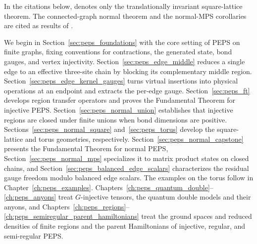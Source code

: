 In the citations below, \cite[Theorem~3]{Molnar2018NormalPEPS} denotes only
the translationally invariant square-lattice theorem. The connected-graph
normal theorem and the normal-MPS corollaries are cited as results of
\cite[Section~4]{Molnar2018NormalPEPS}.

We begin in Section~\ref{sec:peps_foundations} with the core setting of PEPS
on finite graphs, fixing conventions for contractions, the generated state,
bond gauges, and vertex injectivity.
Section~\ref{sec:peps_edge_middle} reduces a single edge to an effective
three-site chain by blocking its complementary middle region.
Section~\ref{sec:peps_edge_kernel_gauges} turns virtual insertions into physical
operations at an endpoint and extracts the per-edge gauge.
Section~\ref{sec:peps_ft} develops region transfer operators and proves
the Fundamental Theorem for injective PEPS.
Section~\ref{sec:peps_normal_union} establishes that injective regions are closed
under finite unions when bond dimensions are positive.
Sections~\ref{sec:peps_normal_square} and~\ref{sec:peps_torus} develop the
square-lattice and torus geometries, respectively.
Section~\ref{sec:peps_normal_capstone} presents the Fundamental Theorem for
normal PEPS, Section~\ref{sec:peps_normal_mps} specializes it to matrix product
states on closed chains, and Section~\ref{sec:peps_balanced_edge_scalars}
characterizes the residual gauge freedom modulo balanced edge scalars.
The examples on the torus follow in Chapter~\ref{ch:peps_examples}.
Chapters~\ref{ch:peps_quantum_double}--\ref{ch:peps_anyons} treat
$G$-injective tensors, the quantum double models and their anyons, and
Chapters~\ref{ch:peps_regions}--\ref{ch:peps_semiregular_parent_hamiltonians}
treat the ground spaces and reduced densities of finite regions and the parent
Hamiltonians of injective, regular, and semi-regular PEPS.





